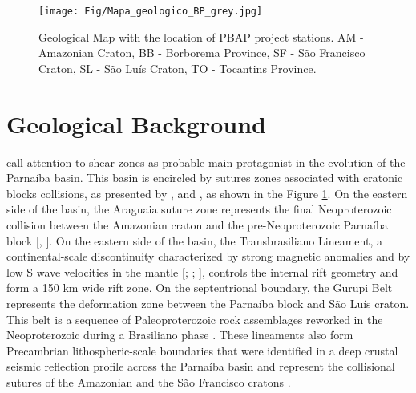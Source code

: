 \documentclass[paper,11pt]{geophysics}
\begin{document}
\begin{figure}[!ht]
\centering
\texttt{[image: Fig/Mapa\_geologico\_BP\_grey.jpg]}
\caption{Geological Map with the location of PBAP project stations. AM - Amazonian Craton, BB - Borborema Province, SF - São Francisco Craton, SL - São Luís Craton, TO - Tocantins Province.}
\label{mapa_estacoes_geologico}
\end{figure}

\section{Geological Background}

\cite{de_castro_geophysical_2016} call attention to shear zones as probable main protagonist in the evolution of the Parnaíba basin. This basin is encircled by sutures zones associated with cratonic blocks collisions, as presented by \cite{daly_brasiliano_2014}, \cite{de_castro_crustal_2014} and \cite{de_castro_geophysical_2016}, as shown in the Figure \ref{mapa_estacoes_geologico}. On the eastern side of the basin, the Araguaia suture zone represents the final Neoproterozoic collision between the Amazonian craton and the pre-Neoproterozoic Parnaíba block [\cite{fuck_rodinia_2008}, \cite{brito_neves_basement_2014}]. On the eastern side of the basin, the Transbrasiliano Lineament, a continental-scale discontinuity characterized by strong magnetic anomalies and by low S wave velocities in the mantle [\cite{fairhead_champ_2003}; \cite{feng_group_velocity_2004};  \cite{brito_neves_basement_2014}], controls the internal rift geometry and form a 150 km wide rift zone. On the septentrional boundary, the Gurupi Belt represents the deformation zone between the Parnaíba block and São Luís craton. This belt is a sequence of Paleoproterozoic rock assemblages reworked in the Neoproterozoic during a Brasiliano phase \citep{klein_gurupi_2005}. These lineaments also form Precambrian lithospheric-scale boundaries that were identified in a deep crustal seismic reflection profile across the Parnaíba basin \cite{daly_brasiliano_2014} and represent the collisional sutures of the Amazonian and the São Francisco cratons \cite{de_castro_crustal_2014}.
\end{document}
